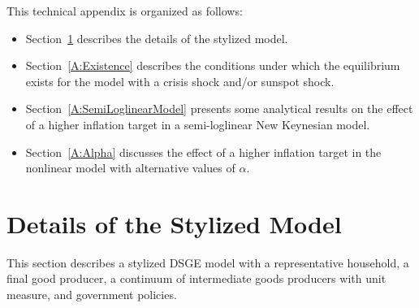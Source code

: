 \documentclass[11pt]{article}
\begin{document}
	\begin{singlespace}

		\vspace{2em}
		\noindent This technical appendix is organized as follows:
		\begin{itemize}
			\item Section~\ref{A:Details_Stylized} describes the details of the stylized model.
			\item Section~\ref{A:Existence} describes the conditions under which the equilibrium exists for the model with a crisis shock and/or sunspot shock.
			\item Section~\ref{A:SemiLoglinearModel} presents some analytical results on the effect of a higher inflation target in a semi-loglinear New Keynesian model.
			\item Section~\ref{A:Alpha} discusses the effect of a higher inflation target in the nonlinear model with alternative values of $\alpha$.
		\end{itemize}

		\section{Details of the Stylized Model}
		\label{A:Details_Stylized}

		\normalsize{This section describes a stylized DSGE model with a representative household, a final good producer, a continuum of intermediate goods producers with unit measure, and government policies.}


\end{singlespace}
\end{document}
